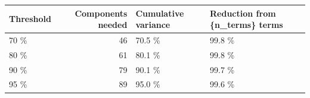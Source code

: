 \begin{tabular}{lrll}
\toprule
Threshold & Components needed & Cumulative variance & Reduction from \{n\_terms\} terms \\
\midrule
70 \% & 46 & 70.5 \% & 99.8 \% \\
80 \% & 61 & 80.1 \% & 99.8 \% \\
90 \% & 79 & 90.1 \% & 99.7 \% \\
95 \% & 89 & 95.0 \% & 99.6 \% \\
\bottomrule
\end{tabular}

